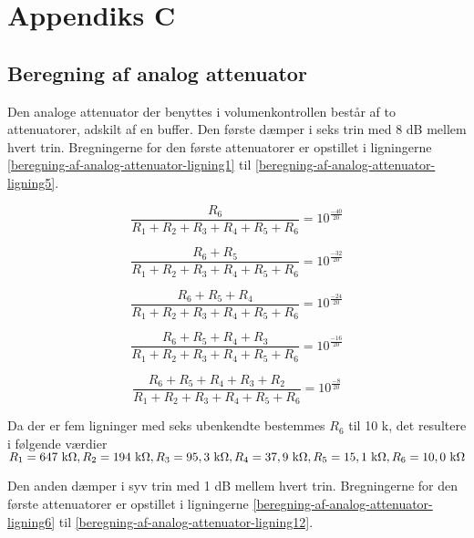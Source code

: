 \chapter{Appendiks C}
\label{beregning-af-analog-attenuator}
\section*{Beregning af analog attenuator}

Den analoge attenuator der benyttes i volumenkontrollen består af to attenuatorer, adskilt af en buffer. Den første dæmper i seks trin med 8 dB mellem hvert trin. Bregningerne for den første attenuatorer er opstillet i ligningerne \ref{beregning-af-analog-attenuator-ligning1} til \ref{beregning-af-analog-attenuator-ligning5}.

\begin{equation}
\label{beregning-af-analog-attenuator-ligning1}
\frac{R_6}{R_1 + R_2 + R_3 + R_4 + R_5 + R_6} = 10^{\frac{-40}{20}}
\end{equation}

\begin{equation}
\frac{R_6 + R_5}{R_1 + R_2 + R_3 + R_4 + R_5 + R_6} = 10^{\frac{-32}{20}}
\end{equation}

\begin{equation}
\frac{R_6 + R_5 + R_4}{R_1 + R_2 + R_3 + R_4 + R_5 + R_6} = 10^{\frac{-24}{20}}
\end{equation}

\begin{equation}
\frac{R_6 + R_5 + R_4 + R_3}{R_1 + R_2 + R_3 + R_4 + R_5 + R_6} = 10^{\frac{-16}{20}}
\end{equation}

\begin{equation}
\label{beregning-af-analog-attenuator-ligning5}
\frac{R_6 + R_5 + R_4 + R_3 + R_2}{R_1 + R_2 + R_3 + R_4 + R_5 + R_6} = 10^{\frac{-8}{20}}
\end{equation}

Da der er fem ligninger med seks ubenkendte bestemmes $R_6$ til 10 k\ohm, det resultere i følgende værdier 
$R_1 = 647 ~\mathrm{k}\ohm, R_2 = 194 ~\mathrm{k}\ohm, R_3 = 95,3 ~\mathrm{k}\ohm, R_4 = 37,9 ~\mathrm{k}\ohm, R_5 = 15,1  ~\mathrm{k}\ohm, R_6 = 10,0 ~\mathrm{k}\ohm$

Den anden dæmper i syv trin med 1 dB mellem hvert trin. Bregningerne for den første attenuatorer er opstillet i ligningerne \ref{beregning-af-analog-attenuator-ligning6} til \ref{beregning-af-analog-attenuator-ligning12}.

